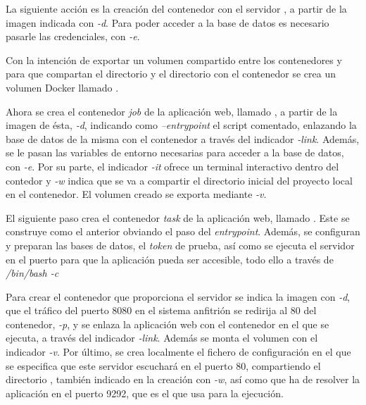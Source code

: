 La siguiente acción es la creación del contenedor  con el servidor , a partir de la imagen  indicada con \textit{\--d}. Para poder acceder a la base de datos es necesario pasarle las credenciales, con \textit{\--e}. 

Con la intención de exportar un volumen compartido entre los contenedores  y  para que compartan el directorio  y el directorio  con el contenedor  se crea un volumen Docker llamado .

Ahora se crea el contenedor \textit{job} de la aplicación web, llamado , a partir de la imagen de ésta, \textit{\--d}, indicando como \textit{\---entrypoint} el script comentado, enlazando la base de datos de la misma con el contenedor  a través del indicador \textit{\--link}. Además, se le pasan las variables de entorno necesarias para acceder a la base de datos, con \textit{\--e}. Por su parte, el indicador \textit{\--it} ofrece un terminal interactivo dentro del contedor y \textit{\--w} indica que se va a compartir el directorio inicial del proyecto local en el contenedor. El volumen creado se exporta mediante \textit{\--v}.

El siguiente paso crea el contenedor \textit{task} de la aplicación web, llamado . Este se construye como el anterior obviando el paso del \textit{entrypoint}. Además, se configuran y preparan las bases de datos, el \textit{token} de prueba, así como se ejecuta el servidor  en el puerto  para que la aplicación pueda ser accesible, todo ello a través de \textit{/bin/bash \--c}

Para crear el contenedor  que proporciona el servidor  se indica la imagen con \textit{\--d}, que el tráfico del puerto 8080 en el sistema anfitrión se redirija al 80 del contenedor, \textit{\--p}, y se enlaza la aplicación web con el contenedor en el que se ejecuta, a través del indicador \textit{\--link}. Además se monta el volumen  con el indicador \textit{\--v}. Por último, se crea localmente el fichero de configuración  en el que se especifica que este servidor escuchará en el puerto 80, compartiendo el directorio , también indicado en la creación con \textit{\--w}, así como que ha de resolver la aplicación en el puerto 9292, que es el que usa  para la ejecución.  

